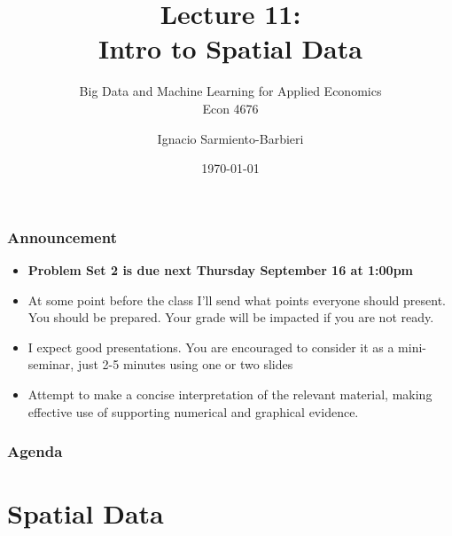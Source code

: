 \documentclass[
  shownotes,
  xcolor={svgnames},
  hyperref={colorlinks,citecolor=DarkBlue,linkcolor=DarkRed,urlcolor=DarkBlue}
   , aspectratio=169]{beamer}
\begin{document}
\title[Lecture 11]{Lecture 11: \\ Intro to Spatial Data}
\subtitle{Big Data and Machine Learning for Applied Economics \\ Econ 4676}
\date{\today}

\author[Sarmiento-Barbieri]{Ignacio Sarmiento-Barbieri}


\begin{frame}[noframenumbering]
\maketitle
\end{frame}



\begin{frame}
\frametitle{Announcement }


\begin{itemize} 
    \item {\bf Problem Set 2 is due next Thursday September 16 at 1:00pm} 
    \medskip
    \item At some point before the class I'll send what points everyone should present. You should be prepared. Your grade will be impacted if you are not ready. 
    \medskip
    \item  I expect good presentations. You are encouraged to consider it as a mini-seminar, just 2-5 minutes using one or two slides
    \medskip
    \item  Attempt to make a concise interpretation of the relevant material, making effective use of supporting numerical and graphical evidence.    
\end{itemize}
\end{frame}


\begin{frame}
\frametitle{Agenda}

\tableofcontents

\end{frame}




\section{Spatial Data }
\end{document}
